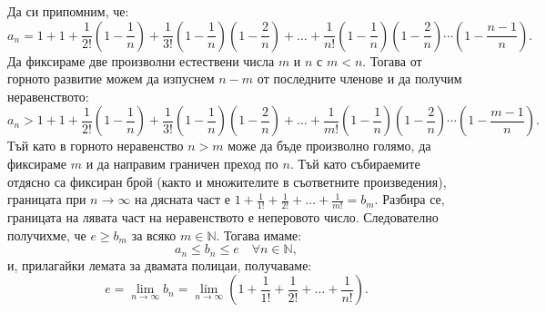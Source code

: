Да си припомним, че:
\[
a_n = 1 + 1 + \frac{1}{2!}\left(1 - \frac{1}{n}\right) + \frac{1}{3!}\left(1 - \frac{1}{n}\right)\left(1 - \frac{2}{n}\right) + \dots + \frac{1}{n!}\left(1 - \frac{1}{n}\right)\left(1 - \frac{2}{n}\right)\cdots\left(1 - \frac{n - 1}{n}\right).
\]
Да фиксираме две произволни естествени числа $m$ и $n$ с $m < n$. Тогава от горното развитие можем да изпуснем $n - m$ от последните членове и да получим неравенството:
\[
a_n > 1 + 1 + \frac{1}{2!}\left(1 - \frac{1}{n}\right) + \frac{1}{3!}\left(1 - \frac{1}{n}\right)\left(1 - \frac{2}{n}\right) + \dots + \frac{1}{m!}\left(1 - \frac{1}{n}\right)\left(1 - \frac{2}{n}\right)\cdots\left(1 - \frac{m - 1}{n}\right).
\]
Тъй като в горното неравенство $n > m$ може да бъде произволно голямо, да фиксираме $m$ и да направим граничен преход по $n$. Тъй като събираемите отдясно са фиксиран брой (както и множителите в съответните произведения), границата при $n \to \infty$ на дясната част е $1 + \frac{1}{1!} + \frac{1}{2!} + \dots + \frac{1}{m!} = b_m$. Разбира се, границата на лявата част на неравенството е неперовото число. Следователно получихме, че $e \ge b_m$ за всяко $m \in \mathbb{N}$. Тогава имаме:
\[
a_n \le b_n \le e \quad \forall n \in \mathbb{N},
\]
и, прилагайки лемата за двамата полицаи, получаваме:
\[
e = \lim_{n\to\infty} b_n = \lim_{n\to\infty} \left(1 + \frac{1}{1!} + \frac{1}{2!} + \dots + \frac{1}{n!}\right).
\]